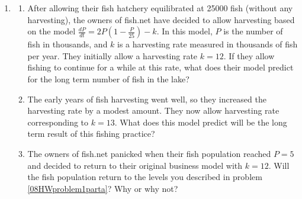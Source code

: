 \begin{enumerate}
\item
\begin{enumerate}
\item After allowing their fish hatchery equilibrated at 25000 fish (without any harvesting), the owners of fish.net have decided to allow harvesting based on the model $\frac{dP}{dt}=2P(1-\frac{P}{25})-k$. In this model, $P$ is the number of fish in thousands, and $k$ is a harvesting rate measured in thousands of fish per year. They initially allow a harvesting rate $k = 12$. If they allow fishing to continue for a while at this rate, what does their model predict for the long term number of fish in the lake? \label{08HWproblem1parta}
\item The early years of fish harvesting went well, so they increased the harvesting rate by a modest amount.  They now allow harvesting rate corresponding to $k = 13$.  What does this model predict will be the long term result of this fishing practice? \label{08HWproblem1partb}
\item The owners of fish.net panicked when their fish population reached $P=5$ and decided to return to their original business model with $k=12$.  Will the fish population return to the levels you described in problem \ref{08HWproblem1parta}?  Why or why not? \label{08HWproblem1partc}
\end{enumerate}


\end{enumerate}
